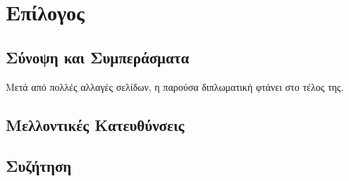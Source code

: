 \chapter{Επίλογος}

\section{Σύνοψη και Συμπεράσματα}

Μετά από πολλές αλλαγές σελίδων, η παρούσα διπλωματική φτάνει στο τέλος της.

\section{Μελλοντικές Κατευθύνσεις}

\section{Συζήτηση}